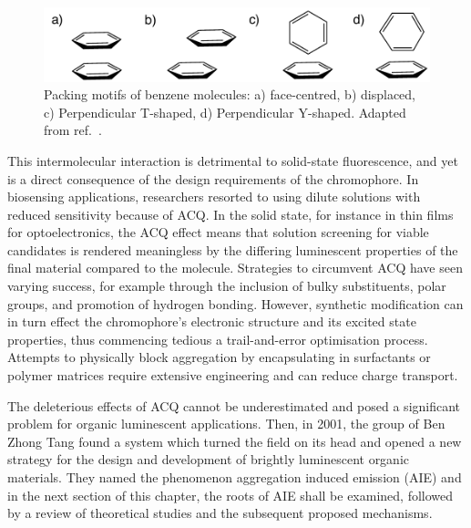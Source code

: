 \begin{figure}[H]
\centering
  \includegraphics[width=0.7\linewidth]{Intro/Stacking.pdf}
  \caption[Benzene Stacking Motifs]{Packing motifs of benzene molecules: a) face-centred, b) displaced, c) Perpendicular T-shaped, d) Perpendicular Y-shaped. Adapted from ref.~.}
  \label{figure: Benzene_Stacking}
\end{figure}


This intermolecular interaction is detrimental to solid-state fluorescence, and yet is a direct consequence of the design requirements of the chromophore. In biosensing applications, researchers resorted to using dilute solutions with reduced sensitivity because of ACQ.\cite{Thomas2007,Kwok2015} In the solid state, for instance in thin films for optoelectronics, the ACQ effect means that solution screening for viable candidates is rendered meaningless by the differing luminescent properties of the final material compared to the molecule. Strategies to circumvent ACQ have seen varying success, for example through the inclusion of bulky substituents, polar groups, and promotion of hydrogen bonding.\cite{Hong2009,Zhang2013,Mei2014,Mei2015} However, synthetic modification can in turn effect the chromophore's electronic structure and its excited state properties, thus commencing tedious a trail-and-error optimisation process. Attempts to physically block aggregation by encapsulating in surfactants or polymer matrices require extensive engineering and can reduce charge transport.\cite{Hong2009,Chen2000,Lee2013} 

The deleterious effects of ACQ cannot be underestimated and posed a significant problem for organic luminescent applications. Then, in 2001, the group of Ben Zhong Tang found a system which turned the field on its head and opened a new strategy for the design and development of brightly luminescent organic materials. They named the phenomenon aggregation induced emission (AIE) and in the next section of this chapter, the roots of AIE shall be examined, followed by a review of theoretical studies and the subsequent proposed mechanisms.
